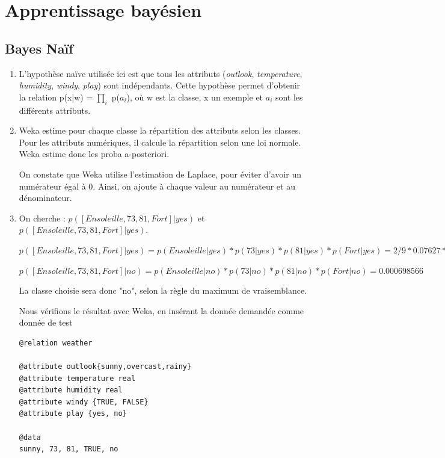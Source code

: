 \documentclass[a4paper]{article}
\begin{document}
\section{Apprentissage bayésien}
\subsection{Bayes Naïf}

\begin{enumerate}

\item L'hypothèse naïve utilisée ici est que tous les attributs (\textit{outlook}, \textit{temperature}, \textit{humidity}, \textit{windy}, \textit{play})  sont indépendants.
Cette hypothèse permet d'obtenir la relation p(x|w) = $\prod_{i}$ p($a_{i}$), où w est la classe, x un exemple et $a_{i}$ sont les différents attributs.

\item Weka estime pour chaque classe la répartition des attributs selon les classes. Pour les attributs numériques, il calcule la répartition selon une loi normale. Weka estime donc les proba a-posteriori.

On constate que Weka utilise l'estimation de Laplace, pour éviter d'avoir un numérateur égal à 0. Ainsi, on ajoute à chaque valeur au numérateur et au dénominateur.

\item On cherche :
$p([Ensoleille, 73, 81, Fort]|yes)$ et $p([Ensoleille, 73, 81, Fort]|yes)$.

$p([Ensoleille, 73, 81, Fort]|yes) = p(Ensoleille|yes) * p (73|yes) * p(81|yes) * p(Fort|yes) 
= 2/9 * 0.07627 * 0.03972 * 3/9 
=  0.000224423$

$p([Ensoleille, 73, 81, Fort]|no) 
= p(Ensoleille|no) * p (73|no) * p(81|no) * p(Fort|no) 
= 0.000698566$

La classe choisie sera donc "no", selon la règle du maximum de vraisemblance.

Nous vérifions le résultat avec Weka, en insérant la donnée demandée comme donnée de test

\begin{lstlisting}[frame=single]
@relation weather

@attribute outlook{sunny,overcast,rainy}
@attribute temperature real
@attribute humidity real
@attribute windy {TRUE, FALSE}
@attribute play {yes, no}

@data
sunny, 73, 81, TRUE, no
\end{lstlisting}


\end{enumerate}
\end{document}
